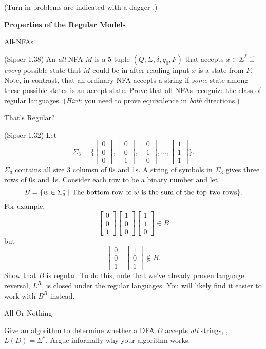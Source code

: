 \documentclass[11pt]{book}
\newcommand{\doctitle}{Properties of the Regular Models}
\begin{document}
\begin{center}
  (Turn-in problems are indicated with a dagger \turninproblem{}.)
\end{center}

\begin{center}
  \large\textbf{{\doctitle}}
\end{center}

\vspace{2em}


\newcommand{\vect}[3]{\begin{bmatrix}#1 \\ #2 \\ #3\end{bmatrix}}

\begin{problem}{All-NFAs}

(Sipser 1.38)
An \emph{all}-NFA \( M \) is a 5-tuple \( (Q, \Sigma, \delta, q_0, F) \) that accepts \( x \in \Sigma^* \) if \emph{every} possible state that \( M \) could be in after reading input \( x \) is a state from \( F \).
Note, in contrast, that an ordinary NFA accepts a string if \emph{some} state among these possible states is an accept state.
Prove that all-NFAs recognize the class of regular languages.
(\emph{Hint}: you need to prove equivalence in \emph{both} directions.)

\vspace{2in}

\begin{problem}{That's Regular?}

(Sipser 1.32)
Let
\[
  \Sigma_3 = \Bigg\{ \vect{0}{0}{0}, \vect{0}{0}{1}, \vect{0}{1}{0}, \ldots, \vect{1}{1}{1} \Bigg\}.
\]
\( \Sigma_3 \) contains all size 3 columsn of 0s and 1s.
A string of symbols in \( \Sigma_3 \) gives three rows of 0s and 1s.
Consider each row to be a binary number and let
\[
  B = \{ w \in \Sigma^*_3 \mid \text{The bottom row of \( w \) is the sum of the top two rows} \}.
\]
For example,
\[
  \vect{0}{0}{1} \vect{1}{0}{0} \vect{1}{1}{0} \in B
\]
but
\[
  \vect{0}{0}{1} \vect{1}{0}{1} \not\in B.
\]
Show that \( B \) is regular.
To do this, note that we've already proven language reversal, \( L^R \), is closed under the regular languages.
You will likely find it easier to work with \( B^R \) instead.

\end{problem}

\newpage

\end{problem}

\begin{problem}{All Or Nothing \turninproblem}

Give an algorithm to determine whether a DFA \( D \) accepts \emph{all} strings, \ie, \( L(D) = Σ^* \).
Argue informally why your algorithm works.

\end{problem}
\end{document}
